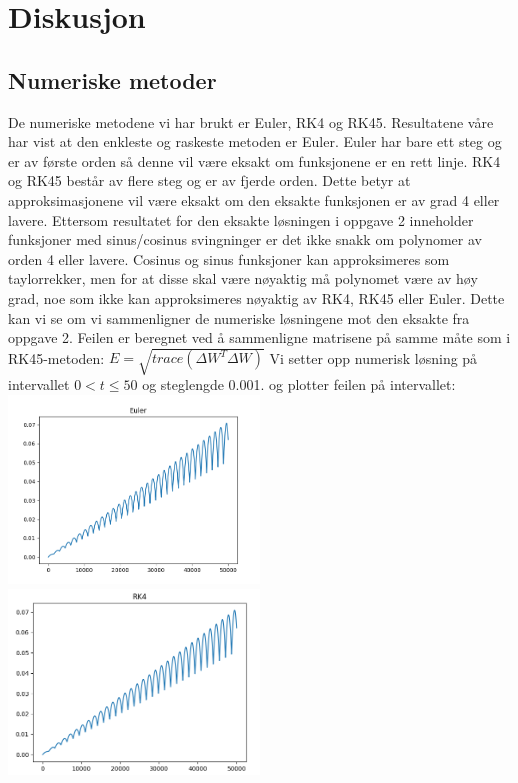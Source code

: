 \section{Diskusjon}
\label{section:diskusjon} 
\subsection{Numeriske metoder}
De numeriske metodene vi har brukt er Euler, RK4 og RK45. Resultatene våre har vist at den enkleste og raskeste metoden er Euler. Euler har bare ett steg og er av første orden så denne vil være eksakt om funksjonene er en rett linje. RK4 og RK45 består av flere steg og er av fjerde orden. Dette betyr at approksimasjonene vil være eksakt om den eksakte funksjonen er av grad 4 eller lavere. Ettersom resultatet for den eksakte løsningen i oppgave 2 inneholder funksjoner med sinus/cosinus svingninger er det ikke snakk om polynomer av orden 4 eller lavere. Cosinus og sinus funksjoner kan approksimeres som taylorrekker, men for at disse skal være nøyaktig må polynomet være av høy grad, noe som ikke kan approksimeres nøyaktig av RK4, RK45 eller Euler. Dette kan vi se om vi sammenligner de numeriske løsningene mot den eksakte fra oppgave 2. Feilen er beregnet ved å sammenligne matrisene på samme måte som i RK45-metoden: \newline
$E = \sqrt{trace(\Delta W^T \Delta W)}$ \newline 
Vi setter opp numerisk løsning på intervallet $0<t\leq50$ og steglengde 0.001. og plotter feilen på intervallet: \newline\newline
\includegraphics[width=0.5\textwidth]{rapport/bilder/eulerError.png}
\includegraphics[width=0.5\textwidth]{rapport/bilder/RK4Error.png}\newline
